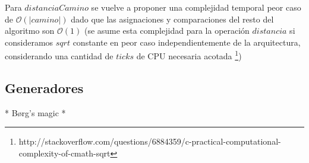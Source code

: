    Para $distanciaCamino$ se vuelve a proponer una complejidad temporal peor caso de $\mathcal{O}(|camino|)$ dado que las asignaciones y comparaciones del resto del algoritmo son $\mathcal{O}(1)$ (se asume esta complejidad para la operación $distancia$ si consideramos $sqrt$ constante en peor caso independientemente de la arquitectura, considerando una cantidad de $ticks$ de CPU necesaria acotada \footnote{http://stackoverflow.com/questions/6884359/c-practical-computational-complexity-of-cmath-sqrt})




   \subsection{Generadores}
   {\color{red}* Børg's magic *}
